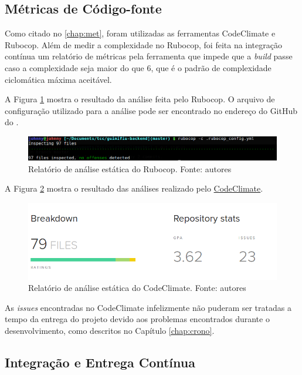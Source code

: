 \subsection{Métricas de Código-fonte}

Como citado no \autoref{chap:met}, foram utilizadas as ferramentas CodeClimate e Rubocop. Além de medir a complexidade no Rubocop, foi feita na integração contínua um relatório de métricas pela ferramenta que impede que a \textit{build} passe caso a complexidade seja maior do que 6, que é o padrão de complexidade ciclomática máxima aceitável.

A Figura \ref{img:rubocop} mostra o resultado da análise feita pelo Rubocop. O arquivo de configuração utilizado para a análise pode ser encontrado no endereço do GitHub do  .

\begin{figure}[H]
    \centering
    \includegraphics[scale=0.5]{figuras/rubocop.png}
    \caption[Relatório de análise estática do Rubocop]{Relatório de análise estática do Rubocop. Fonte: autores}
    \label{img:rubocop}
\end{figure}

A Figura \ref{img:codeclimate} mostra o resultado das análises realizado pelo \href{https://codeclimate.com/github/Guimifiu/guimifiu-backend/}{CodeClimate}.

\begin{figure}[H]
    \centering
    \includegraphics[scale=0.5]{figuras/codeclimate.png}
    \caption[Relatório de análise estática do CodeClimate]{Relatório de análise estática do CodeClimate. Fonte: autores}
    \label{img:codeclimate}
\end{figure}

As \textit{issues} encontradas no CodeClimate infelizmente não puderam ser tratadas a tempo da entrega do projeto devido aos problemas encontrados durante o desenvolvimento, como descritos no Capítulo \ref{chap:crono}.


\subsection{Integração e Entrega Contínua}

